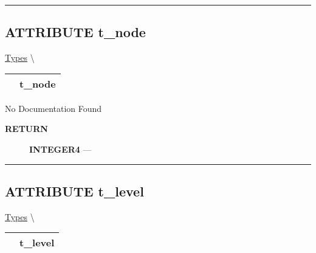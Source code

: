 \rule{\linewidth}{0.5pt}
\subsection*{\textsf{\colorbox{headtoc}{\color{white} ATTRIBUTE}
t\_node}}

\hypertarget{ecldoc:ml_core.types.t_node}{}
\hspace{0pt} \hyperlink{ecldoc:ML_Core.Types}{Types} \textbackslash 

{\renewcommand{\arraystretch}{1.5}
\begin{tabularx}{\textwidth}{|>{\raggedright\arraybackslash}l|X|}
\hline
\hspace{0pt}\mytexttt{\color{red} } & \textbf{t\_node} \\
\hline
\end{tabularx}
}

\par





No Documentation Found








\par
\begin{description}
\item [\colorbox{tagtype}{\color{white} \textbf{\textsf{RETURN}}}] \textbf{INTEGER4} --- 
\end{description}




\rule{\linewidth}{0.5pt}
\subsection*{\textsf{\colorbox{headtoc}{\color{white} ATTRIBUTE}
t\_level}}

\hypertarget{ecldoc:ml_core.types.t_level}{}
\hspace{0pt} \hyperlink{ecldoc:ML_Core.Types}{Types} \textbackslash 

{\renewcommand{\arraystretch}{1.5}
\begin{tabularx}{\textwidth}{|>{\raggedright\arraybackslash}l|X|}
\hline
\hspace{0pt}\mytexttt{\color{red} } & \textbf{t\_level} \\
\hline
\end{tabularx}
}

\par





